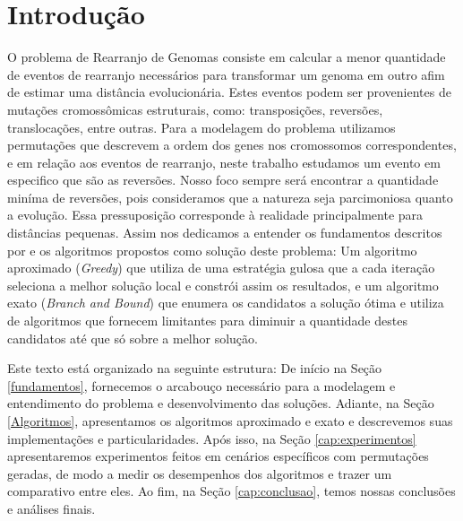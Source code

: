 \chapter{Introdução}
    
    
    O problema de Rearranjo de Genomas consiste em calcular a menor quantidade de eventos de rearranjo necessários para transformar um genoma em outro afim de estimar uma distância evolucionária. Estes eventos podem ser provenientes de mutações cromossômicas estruturais, como: transposições, reversões, translocações, entre outras. Para a modelagem do problema utilizamos permutações que descrevem a ordem dos genes nos cromossomos correspondentes, e em relação aos eventos de rearranjo, neste trabalho estudamos um evento em especifico que são as reversões. Nosso foco sempre será encontrar a quantidade miníma de reversões, pois consideramos que a natureza seja parcimoniosa quanto a evolução. Essa pressuposição corresponde à realidade principalmente para distâncias pequenas. Assim nos dedicamos a entender os fundamentos descritos por \cite{kececioglu1995exact} e os algoritmos propostos como solução deste problema: Um algoritmo aproximado (\textit{Greedy}) que utiliza de uma estratégia gulosa que a cada iteração seleciona a melhor solução local e constrói assim os resultados, e um algoritmo exato (\textit{Branch and Bound}) que enumera os candidatos a solução ótima e utiliza de algoritmos que fornecem limitantes para diminuir a quantidade destes candidatos até que só sobre a melhor solução.
    
    
      Este texto está organizado na seguinte estrutura: De início na Seção \ref{fundamentos}, fornecemos o arcabouço necessário para a modelagem e entendimento do problema e desenvolvimento das soluções. Adiante, na Seção \ref{Algoritmos}, apresentamos os algoritmos aproximado e exato e descrevemos suas implementações e particularidades. Após isso, na Seção \ref{cap:experimentos} apresentaremos experimentos feitos em cenários específicos com permutações geradas, de modo a medir os desempenhos dos algoritmos e trazer um comparativo entre eles. Ao fim, na Seção \ref{cap:conclusao}, temos nossas conclusões e análises finais.
  
